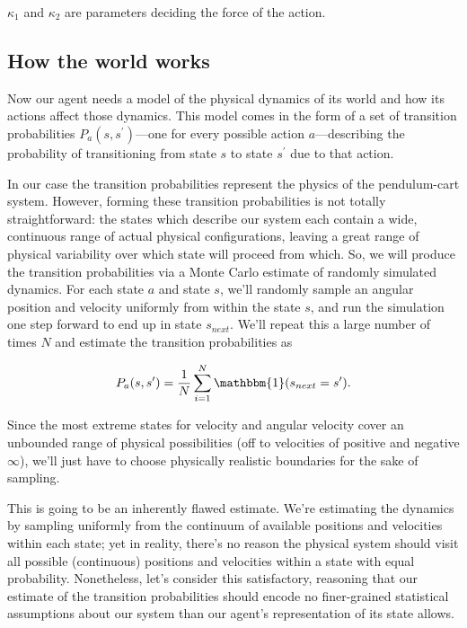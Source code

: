 \documentclass[12pt]{article}
\begin{document}
$\kappa_1$ and $\kappa_2$ are parameters deciding the force of the action.

\subsection{How the world works}

Now our agent needs a model of the physical dynamics of its world and how its actions affect those dynamics. This model comes in the form of a set of transition probabilities $P_a(s, s^\prime)$---one for every possible action $a$---describing the probability of transitioning from state $s$ to state $s^\prime$ due to that action.

In our case the transition probabilities represent the physics of the pendulum-cart system. However, forming these transition probabilities is not totally straightforward: the states which describe our system each contain a wide, continuous range of actual physical configurations, leaving a great range of physical variability over which state will proceed from which. So, we will produce the transition probabilities via a Monte Carlo estimate of randomly simulated dynamics. For each state $a$ and state $s$, we'll randomly sample an angular position and velocity uniformly from within the state $s$, and run the simulation one step forward to end up in state $s_{next}$. We'll repeat this a large number of times $N$ and estimate the transition probabilities as

\begin{equation}
P_a(s, s^\prime) = \frac{1}{N}\sum_{i = 1}^N \mathbbm{1}(s_{next} = s^\prime).
\end{equation}

Since the most extreme states for velocity and angular velocity cover an unbounded range of physical possibilities (off to velocities of positive and negative $\infty$), we'll just have to choose physically realistic boundaries for the sake of sampling.

This is going to be an inherently flawed estimate. We're estimating the dynamics by sampling uniformly from the continuum of available positions and velocities within each state; yet in reality, there's no reason the physical system should visit all possible (continuous) positions and velocities within a state with equal probability. Nonetheless, let's consider this satisfactory, reasoning that our estimate of the transition probabilities should encode no finer-grained statistical assumptions about our system than our agent's representation of its state allows.\footnotemark
\end{document}
